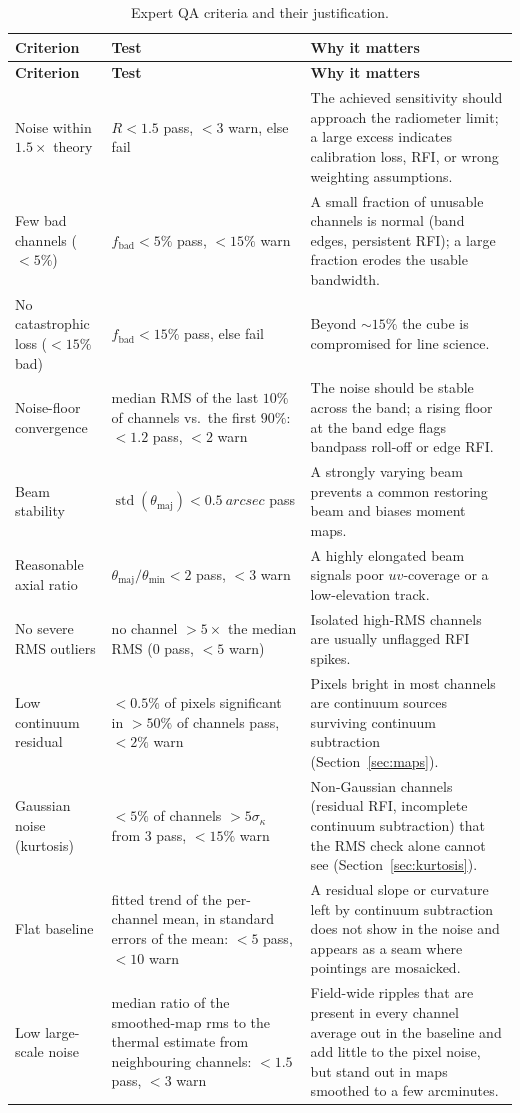 \documentclass[11pt,a4paper]{article}
\begin{document}
\begin{longtable}{@{}L{0.30\textwidth} L{0.34\textwidth} L{0.30\textwidth}@{}}
\caption{Expert QA criteria and their justification.}\label{tab:checklist}\\
\toprule
\textbf{Criterion} & \textbf{Test} & \textbf{Why it matters}\\
\midrule
\endfirsthead
\toprule
\textbf{Criterion} & \textbf{Test} & \textbf{Why it matters}\\
\midrule
\endhead
\bottomrule
\endfoot
Noise within $1.5\times$ theory &
$R < 1.5$ pass, $<3$ warn, else fail &
The achieved sensitivity should approach the radiometer limit; a large excess
indicates calibration loss, RFI, or wrong weighting assumptions.\\[2pt]
Few bad channels ($<5\%$) &
$f_{\mathrm{bad}} < 5\%$ pass, $<15\%$ warn &
A small fraction of unusable channels is normal (band edges, persistent RFI);
a large fraction erodes the usable bandwidth.\\[2pt]
No catastrophic loss ($<15\%$ bad) &
$f_{\mathrm{bad}} < 15\%$ pass, else fail &
Beyond $\sim15\%$ the cube is compromised for line science.\\[2pt]
Noise-floor convergence &
median RMS of the last $10\%$ of channels vs.\ the first $90\%$:
$<1.2$ pass, $<2$ warn &
The noise should be stable across the band; a rising floor at the band edge
flags bandpass roll-off or edge RFI.\\[2pt]
Beam stability &
$\operatorname{std}(\theta_{\mathrm{maj}}) < \SI{0.5}{arcsec}$ pass &
A strongly varying beam prevents a common restoring beam and biases moment
maps.\\[2pt]
Reasonable axial ratio &
$\theta_{\mathrm{maj}}/\theta_{\mathrm{min}} < 2$ pass, $<3$ warn &
A highly elongated beam signals poor $uv$-coverage or a low-elevation track.\\[2pt]
No severe RMS outliers &
no channel $> 5\times$ the median RMS (0 pass, $<5$ warn) &
Isolated high-RMS channels are usually unflagged RFI spikes.\\[2pt]
Low continuum residual &
$<0.5\%$ of pixels significant in $>50\%$ of channels pass, $<2\%$ warn &
Pixels bright in most channels are continuum sources surviving continuum
subtraction (Section~\ref{sec:maps}).\\[2pt]
Gaussian noise (kurtosis) &
$<5\%$ of channels $>5\sigma_{\kappa}$ from 3 pass, $<15\%$ warn &
Non-Gaussian channels (residual RFI, incomplete continuum subtraction) that the
RMS check alone cannot see (Section~\ref{sec:kurtosis}).\\[2pt]
Flat baseline &
fitted trend of the per-channel mean, in standard errors of the mean:
$<5$ pass, $<10$ warn &
A residual slope or curvature left by continuum subtraction does not show in the noise
and appears as a seam where pointings are mosaicked.\\[2pt]
Low large-scale noise &
median ratio of the smoothed-map rms to the thermal estimate from neighbouring
channels: $<1.5$ pass, $<3$ warn &
Field-wide ripples that are present in every channel average out in the baseline and add
little to the pixel noise, but stand out in maps smoothed to a few arcminutes.\\
\end{longtable}
\end{document}
